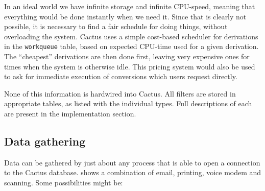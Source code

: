 In an ideal world we have infinite storage and infinite CPU-speed,
meaning that everything would be done instantly when we need it.
Since that is clearly not possible, it is necessary to find a fair
schedule for doing things, without overloading the system.  Cactus
uses a simple cost-based scheduler for derivations in the
\texttt{workqueue} table, based on expected CPU-time used for a given
derivation.  The ``cheapest'' derivations are then done first, leaving
very expensive ones for times when the system is otherwise idle.  This
pricing system would also be used to ask for immediate execution of
conversions which users request directly.


None of this information is hardwired into Cactus.  All
filters are stored in appropriate tables, as listed with the
individual types.  Full descriptions of each are present in
the implementation section.

\subsection{Data gathering}


Data can be gathered by just about any process that is able
to open a connection to the Cactus database.
 shows a combination of email, printing,
voice modem and scanning.  Some possibilities might be:


